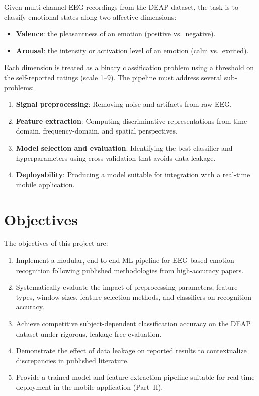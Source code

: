 \documentclass[12pt,a4paper]{report}
\begin{document}
Given multi-channel EEG recordings from the DEAP dataset, the task is to
classify emotional states along two affective dimensions:

\begin{itemize}[noitemsep]
    \item \textbf{Valence}: the pleasantness of an emotion (positive vs.\ negative).
    \item \textbf{Arousal}: the intensity or activation level of an emotion (calm vs.\ excited).
\end{itemize}

Each dimension is treated as a binary classification problem using a threshold
on the self-reported ratings (scale 1--9). The pipeline must address several
sub-problems:

\begin{enumerate}[noitemsep]
    \item \textbf{Signal preprocessing}: Removing noise and artifacts from raw EEG.
    \item \textbf{Feature extraction}: Computing discriminative representations
          from time-domain, frequency-domain, and spatial perspectives.
    \item \textbf{Model selection and evaluation}: Identifying the best classifier
          and hyperparameters using cross-validation that avoids data leakage.
    \item \textbf{Deployability}: Producing a model suitable for integration
          with a real-time mobile application.
\end{enumerate}

\section{Objectives}
\label{sec:objectives}

The objectives of this project are:

\begin{enumerate}[noitemsep]
    \item Implement a modular, end-to-end ML pipeline for EEG-based emotion
          recognition following published methodologies from high-accuracy papers.
    \item Systematically evaluate the impact of preprocessing parameters,
          feature types, window sizes, feature selection methods, and classifiers
          on recognition accuracy.
    \item Achieve competitive subject-dependent classification accuracy on the
          DEAP dataset under rigorous, leakage-free evaluation.
    \item Demonstrate the effect of data leakage on reported results to
          contextualize discrepancies in published literature.
    \item Provide a trained model and feature extraction pipeline suitable for
          real-time deployment in the mobile application (Part~II).
\end{enumerate}
\end{document}
